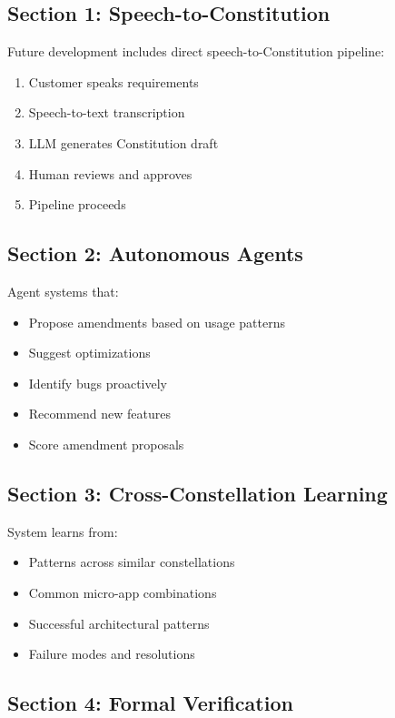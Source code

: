 \documentclass[12pt,letterpaper]{article}
\begin{document}
\subsection{Section 1: Speech-to-Constitution}

Future development includes direct speech-to-Constitution pipeline:

\begin{enumerate}
    \item Customer speaks requirements
    \item Speech-to-text transcription
    \item LLM generates Constitution draft
    \item Human reviews and approves
    \item Pipeline proceeds
\end{enumerate}

\subsection{Section 2: Autonomous Agents}

Agent systems that:

\begin{itemize}
    \item Propose amendments based on usage patterns
    \item Suggest optimizations
    \item Identify bugs proactively
    \item Recommend new features
    \item Score amendment proposals
\end{itemize}

\subsection{Section 3: Cross-Constellation Learning}

System learns from:

\begin{itemize}
    \item Patterns across similar constellations
    \item Common micro-app combinations
    \item Successful architectural patterns
    \item Failure modes and resolutions
\end{itemize}

\subsection{Section 4: Formal Verification}
\end{document}
